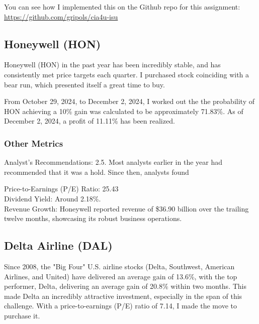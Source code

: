 \documentclass[a4paper, 12pt]{article}
\begin{document}
You can see how I implemented this on the Github repo for this assignment:
\url{https://github.com/gripols/cia4u-isu}


\subsection*{Honeywell (HON)}%
Honeywell (HON) in the past year has been incredibly 
stable, and has consistently met price targets each 
quarter. I purchased stock coinciding with a bear run, 
which presented itself a great time to buy. 

From October 29, 2024, to December 2, 2024, I worked out the the probability of HON achieving a 10\% gain was calculated to be approximately 71.83\%. As of December 2,
2024, a profit of 11.11\% has been realized.

\subsubsection*{Other Metrics}

Analyst's Recommendations: 2.5. Most analysts earlier in the year
had recommended that it was a hold. Since then, analysts found

Price-to-Earnings (P/E) Ratio: 25.43 \\

Dividend Yield: Around 2.18\%. \\

Revenue Growth: Honeywell reported revenue of \$36.90 billion 
over the trailing twelve months, showcasing its robust business operations. \\


\subsection*{Delta Airline (DAL)}%

Since 2008, the "Big Four" U.S. airline stocks (Delta, Southwest, 
American Airlines, and United) have delivered an average gain of 13.6\%, 
with the top performer, Delta, delivering an average gain of 20.8\% within two months.
This made Delta an incredibly attractive investment, especially in the span 
of this challenge. With a price-to-earnings (P/E) ratio of 7.14, 
I made the move to purchase it.\\
\end{document}
